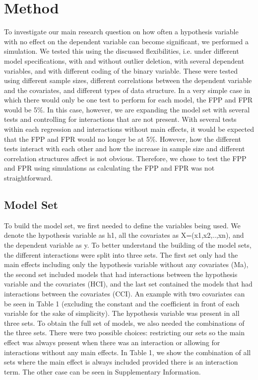 \section{Method}

To investigate our main research question on how often a hypothesis variable with no effect on the dependent variable can become significant, we performed a simulation. We tested this using the discussed flexibilities, i.e. under different model specifications, with and without outlier deletion, with several dependent variables, and with different coding of the binary variable. These were tested using different sample sizes, different correlations between the dependent variable and the covariates, and different types of data structure. In a very simple case in which there would only be one test to perform for each model, the FPP and FPR would be 5\%. In this case, however, we are expanding the model set with several tests and controlling for interactions that are not present. With several tests within each regression and interactions without main effects, it would be expected that the FPP and FPR would no longer be at 5\%. However, how the different tests interact with each other and how the increase in sample size and different correlation structures affect is not obvious. Therefore, we chose to test the FPP and FPR using simulations as calculating the FPP and FPR was not straightforward.

\subsection{Model Set}
To build the model set, we first needed to define the variables being used. We denote the hypothesis variable as h1, all the covariates as X=(x1,x2,..,xn), and the dependent variable as y. To better understand the building of the model sets, the different interactions were split into three sets. The first set only had the main effects including only the hypothesis variable without any covariates (Ma), the second set included models that had interactions between the hypothesis variable and the covariates (HCI), and the last set contained the models that had interactions between the covariates (CCI). An example with two covariates can be seen in Table 1 (excluding the constant and the coefficient in front of each variable for the sake of simplicity). The hypothesis variable was present in all three sets.
To obtain the full set of models, we also needed the combinations of the three sets. There were two possible choices: restricting our sets so the main effect was always present when there was an interaction or allowing for interactions without any main effects. In Table 1, we show the combination of all sets where the main effect is always included provided there is an interaction term. The other case can be seen in Supplementary Information. \\


